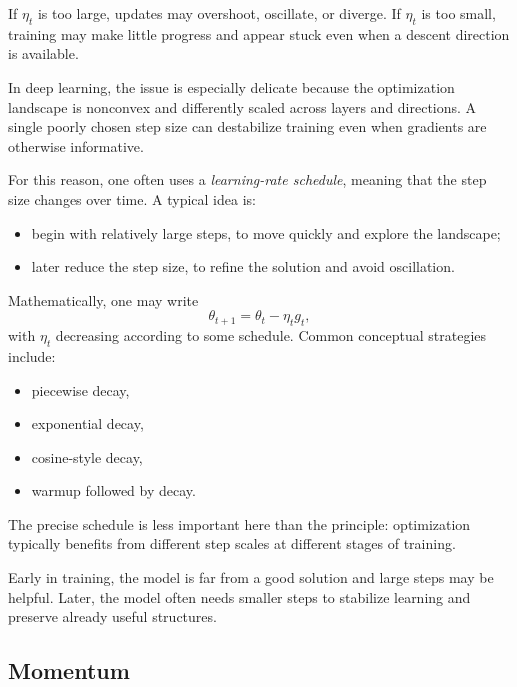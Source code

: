 \medskip

If $\eta_t$ is too large, updates may overshoot, oscillate, or diverge.
If $\eta_t$ is too small, training may make little progress and appear stuck even when a descent direction is available.

\medskip

In deep learning, the issue is especially delicate because the optimization landscape is nonconvex and differently scaled across layers and directions.
A single poorly chosen step size can destabilize training even when gradients are otherwise informative.

\medskip

For this reason, one often uses a \emph{learning-rate schedule}, meaning that the step size changes over time.
A typical idea is:
\begin{itemize}
    \item begin with relatively large steps, to move quickly and explore the landscape;
    \item later reduce the step size, to refine the solution and avoid oscillation.
\end{itemize}

\medskip

Mathematically, one may write
\[
\theta_{t+1}=\theta_t-\eta_t g_t,
\]
with $\eta_t$ decreasing according to some schedule.
Common conceptual strategies include:
\begin{itemize}
    \item piecewise decay,
    \item exponential decay,
    \item cosine-style decay,
    \item warmup followed by decay.
\end{itemize}

\medskip

The precise schedule is less important here than the principle:
optimization typically benefits from different step scales at different stages of training.

\medskip

Early in training, the model is far from a good solution and large steps may be helpful.
Later, the model often needs smaller steps to stabilize learning and preserve already useful structures.

\subsection*{Momentum}

